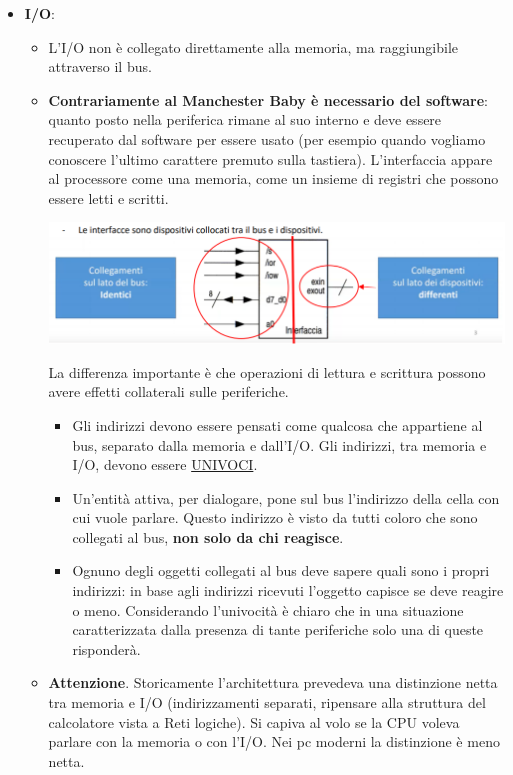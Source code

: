 \begin{itemize}
	\item \textbf{I/O}:
	\begin{itemize}
		\item L'I/O non è collegato direttamente alla memoria, ma raggiungibile attraverso il bus.
		\item \textbf{Contrariamente al Manchester Baby è necessario del software}: quanto posto nella periferica rimane al suo interno e deve essere recuperato dal software per essere usato (per esempio quando vogliamo conoscere l'ultimo carattere premuto sulla tastiera). L'interfaccia appare al processore come una memoria, come un insieme di registri che possono essere letti e scritti. 
		\begin{center}
			\includegraphics[scale=.75]{img/132.PNG}
		\end{center}
		La differenza importante è che operazioni di lettura e scrittura possono avere effetti collaterali sulle periferiche. 
		
		\begin{itemize}
			\item Gli indirizzi devono essere pensati come qualcosa che appartiene al bus, separato dalla memoria e dall'I/O. Gli indirizzi, tra memoria e I/O, devono essere \underline{UNIVOCI}.
			\item Un'entità attiva, per dialogare, pone sul bus l'indirizzo della cella con cui vuole parlare. Questo indirizzo è visto da tutti coloro che sono collegati al bus, \textbf{non solo da chi reagisce}.
			\item Ognuno degli oggetti collegati al bus deve sapere quali sono i propri indirizzi: in base agli indirizzi ricevuti l'oggetto capisce se deve reagire o meno. Considerando l'univocità è chiaro che in una situazione caratterizzata dalla presenza di tante periferiche solo una di queste risponderà.
		\end{itemize}
		
		\item \textbf{Attenzione}. Storicamente l'architettura prevedeva una distinzione netta tra memoria e I/O (indirizzamenti separati, ripensare alla struttura del calcolatore vista a Reti logiche). Si capiva al volo se la CPU voleva parlare con la memoria o con l'I/O. Nei pc moderni la distinzione è meno netta.
	\end{itemize}
\end{itemize}
